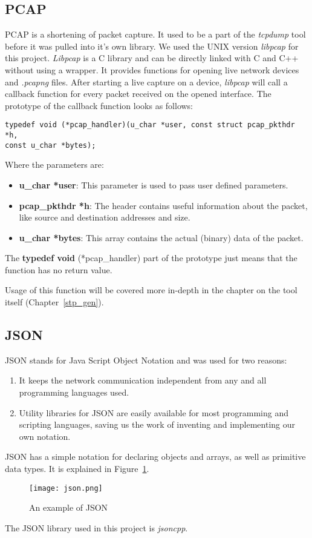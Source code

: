 \subsection{PCAP}
PCAP is a shortening of packet capture.
It used to be a part of the \textit{tcpdump} tool before it was pulled into it's own library.
We used the UNIX version \textit{libpcap} for this project.
\textit{Libpcap} is a C library and can be directly linked with C and C++ without using a wrapper.
It provides functions for opening live network devices and \textit{.pcapng} files.
After starting a live capture on a device, \textit{libpcap} will call a callback function for every packet received on the opened interface.
The prototype of the callback function looks as follows:
\begin{lstlisting}
typedef void (*pcap_handler)(u_char *user, const struct pcap_pkthdr *h,
const u_char *bytes);
\end{lstlisting}
Where the parameters are:
\begin{itemize}
    \item \textbf{u\_char *user}: This parameter is used to pass user defined parameters.
    \item \textbf{pcap\_pkthdr *h}: The header contains useful information about the packet, like source and destination addresses and size.
    \item \textbf{u\_char *bytes}: This array contains the actual (binary) data of the packet.
\end{itemize}
The \textbf{typedef void} (*pcap\_handler) part of the prototype just means that the function has no return value.

Usage of this function will be covered more in-depth in the chapter on the tool itself (Chapter~\ref{stp_gen}).
\subsection{JSON}
JSON stands for Java Script Object Notation and was used for two reasons:
\begin{enumerate}
    \item It keeps the network communication independent from any and all programming languages used.
    \item Utility libraries for JSON are easily available for most programming and scripting languages, saving us the work of inventing and implementing our own notation.
\end{enumerate}
JSON has a simple notation for declaring objects and arrays, as well as primitive data types.
It is explained in Figure~\ref{fig:json}.

\begin{figure}[h]
    \centering
    \texttt{[image: json.png]}
    \caption{An example of JSON}
    \label{fig:json}
\end{figure}

The JSON library used in this project is \textit{jsoncpp}\cite{jsoncpp}.
